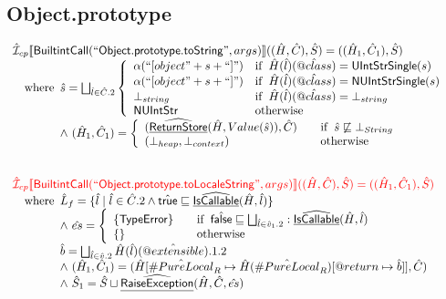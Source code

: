 \documentclass{article}
\makeatletter
\newcommand{\SF}[1]{\mbox{\textsf{#1}}}
\newcommand{\wherec}[1]{{\rm where}\begin{array}[t]{l}#1\end{array}}
\newcommand{\ifc}[1]{{\rm if}\begin{array}[t]{l}#1\end{array}}
\newcommand{\owc}{{\rm otherwise}}
\newcommand{\aI}{\hat{\mathcal{I}}}
\newcommand{\lbr}{\llbracket}
\newcommand{\rbr}{\rrbracket}
\newcommand{\ahf}[1]{\widehat{\underline{\sf #1}}}
\newcommand{\varprop}[1]{@#1}
\newcommand{\avarloc}[1]{\hat{\##1}}
\newcommand{\avarprop}[1]{\hat{@#1}}
\newcommand{\atrue}{\hat{\SF{true}}}
\newcommand{\afalse}{\hat{\SF{false}}}
\def\inred{\color{red}}
\def\inred{\color{red}}
\makeatother
\begin{document}
\subsection{Object.prototype}
\[
\begin{array}{l}
\aI _{cp}\lbr \SF{BuiltintCall}(``\SF{Object.prototype.toString}",args)\rbr((\hat{H},\hat{C}), \hat{S})
  = ((\hat{H}_1, \hat{C}_1), \hat{S})\\
\quad\wherec{
  \hat{s} = \bigsqcup_{\hat{l}\in\hat{C}.2} \left\{\begin{array}{ll}
    \alpha(``[object"+ s +``]" ) & \ifc{\hat{H}(\hat{l})(\avarprop{class}) =\SF{UIntStrSingle}(s)}\\
    \alpha(``[object"+ s +``]" ) & \ifc{\hat{H}(\hat{l})(\avarprop{class}) =\SF{NUIntStrSingle}(s)}\\
    \bot_{string} & \ifc{\hat{H}(\hat{l})(\avarprop{class}) = \bot_{string}}\\
    \SF{NUIntStr} & \owc
    \end{array}\right.\\
  \land\ (\hat{H}_1, \hat{C}_1) = 
    \left\{\begin{array}{l@{\quad\quad}l}
      (\ahf{ReturnStore}(\hat{H}, Value(\hat{s})), \hat{C})
      & \ifc{\hat{s} \not\sqsubseteq \bot_{String}}\\
      (\bot_{heap}, \bot_{context}) & \owc \\
    \end{array}\right.\\    
  }\\
\\\\ 



\inred \aI _{cp}\lbr \SF{BuiltintCall}(``\SF{Object.prototype.toLocaleString}",args)\rbr((\hat{H},\hat{C}), \hat{S})
  = ((\hat{H}_1, \hat{C}_1), \hat{S})\\
\quad\wherec{
  \hat{L}_f = \{ \hat{l} \mid \hat{l} \in \hat{C}.2 \land \atrue \sqsubseteq\ahf{IsCallable}(\hat{H}, \hat{l})\}\\
  \land\ \hat{es} =
    \left\{
    \begin{array}{l@{\quad\quad}l}
      \{ \SF{TypeError} \}
      & \ifc{\afalse \sqsubseteq \bigsqcup_{\hat{l}\in\hat{v}_1.2}:\ahf{IsCallable}(\hat{H}, \hat{l})}\\
      \{ \}& \owc\\
    \end{array}
    \right.\\
  \hat{b} = \bigsqcup_{\hat{l} \in \hat{v}.2} \hat{H}(\hat{l})(\avarprop{extensible}).1.2\\
  \land\ (\hat{H}_1, \hat{C}_1) = 
      (\hat{H}[\avarloc{PureLocal}_R \mapsto \hat{H}(\avarloc{PureLocal}_R)[\varprop{return} \mapsto \hat{b}]], \hat{C})\\
  \land\ \hat{S}_1 = \hat{S} \sqcup \ahf{RaiseException}(\hat{H}, \hat{C}, \hat{es})\\
  }\\
\\\\ 




\end{array}\]
\end{document}
